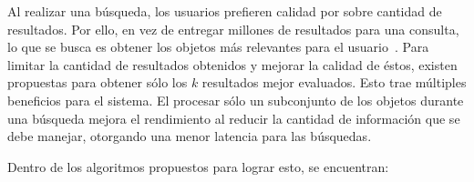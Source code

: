 


Al realizar una búsqueda, los usuarios prefieren calidad por sobre cantidad de
resultados. Por ello, en vez de entregar millones de resultados para una
consulta, lo que se busca es obtener los objetos más relevantes para el usuario~\citealt{oulasvirta2009more}. %
Para limitar la cantidad de resultados obtenidos y mejorar la calidad de éstos,
existen propuestas para obtener sólo los $k$ resultados mejor evaluados.
Esto trae múltiples beneficios para el sistema. El procesar sólo un subconjunto
de los objetos durante una búsqueda mejora el rendimiento al reducir la
cantidad de información que se debe manejar, otorgando una menor latencia para las búsquedas.

Dentro de los algoritmos propuestos para lograr esto, se encuentran:



%

